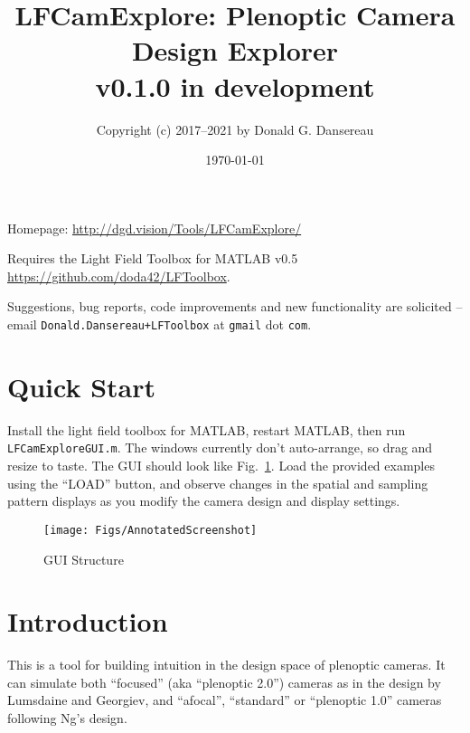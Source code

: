 \documentclass[onecolumn]{article}
\title{
LFCamExplore: Plenoptic Camera Design Explorer\\
{\large v0.1.0 in development }}
\author{Copyright (c) 2017--2021 by Donald G. Dansereau}
\date{\today}
\newcommand{\SymbolText}[1]{\texttt{\small #1}}
\begin{document}
\maketitle
\thispagestyle{empty}\pagestyle{plain}

\noindent
Homepage: \url{http://dgd.vision/Tools/LFCamExplore/}

\vspace{1em}\noindent
Requires the Light Field Toolbox for MATLAB v0.5 \url{https://github.com/doda42/LFToolbox}.

\vspace{1em}\noindent 
Suggestions, bug reports, code improvements and new functionality are solicited -- email \SymbolText{Donald.Dansereau+LFToolbox} \small{at} \SymbolText{gmail} \small{dot} \SymbolText{com}.


\newpage
\tableofcontents
\newpage

\section{Quick Start}

Install the light field toolbox for MATLAB, restart MATLAB, then run \SymbolText{LFCamExploreGUI.m}.  The windows currently don't auto-arrange, so drag and resize to taste.  The GUI should look like Fig.~\ref{fig_AnnotatedScreenshot}.  Load the provided examples using the ``LOAD'' button, and observe changes in the spatial and sampling pattern displays as you modify the camera design and display settings.

\begin{figure}[h!]
	\centering
	\texttt{[image: Figs/AnnotatedScreenshot]}
	\caption{GUI Structure}
	\label{fig_AnnotatedScreenshot}
\end{figure}



\section{Introduction}

This is a tool for building intuition in the design space of plenoptic cameras.  It can simulate both ``focused'' (aka ``plenoptic 2.0'') cameras as in the design by Lumsdaine and Georgiev, and ``afocal'', ``standard'' or ``plenoptic 1.0'' cameras following Ng's design.
\end{document}
